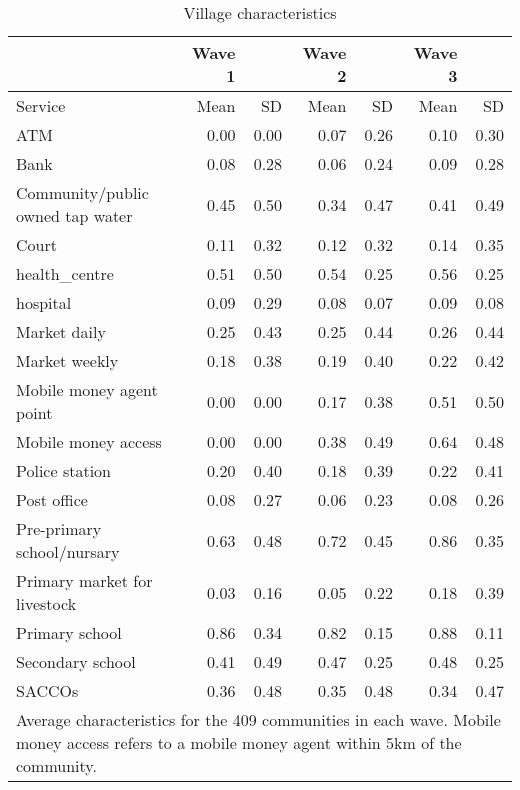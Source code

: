 \begin{table}[htbp] 
  \centering
  \caption{Village characteristics} \label{village sum}
    \begin{tabular}{lrrrrrr}
    \toprule
          & Wave 1 &       & Wave 2 &       & Wave 3 &  \\
    \midrule
     Service     & Mean  &  SD   & Mean  &  SD   & Mean  &  SD  \\
  
    ATM   & 0.00  & 0.00  & 0.07  & 0.26  & 0.10  & 0.30 \\
    Bank  & 0.08  & 0.28  & 0.06  & 0.24  & 0.09  & 0.28 \\
    Community/public owned tap water & 0.45  & 0.50  & 0.34  & 0.47  & 0.41  & 0.49 \\
    Court & 0.11  & 0.32  & 0.12  & 0.32  & 0.14  & 0.35 \\
    health\_centre&    0.51&    0.50 & 0.54 & 0.25 &0.56  & 0.25 \\
hospital    &    0.09&     0.29 & 0.08 & 0.07 & 0.09 & 0.08 \\
    Market daily & 0.25  & 0.43  & 0.25  & 0.44  & 0.26  & 0.44 \\
    Market weekly & 0.18  & 0.38  & 0.19  & 0.40  & 0.22  & 0.42\\
    Mobile money agent point & 0.00  & 0.00  & 0.17  & 0.38  & 0.51  & 0.50 \\
    Mobile money access  & 0.00  & 0.00  & 0.38  & 0.49  & 0.64  & 0.48 \\
   
    Police station & 0.20  & 0.40  & 0.18  & 0.39  & 0.22  & 0.41 \\
    Post office & 0.08  & 0.27  & 0.06  & 0.23  & 0.08  & 0.26 \\
    Pre-primary school/nursary & 0.63  & 0.48  & 0.72  & 0.45  & 0.86  & 0.35 \\
    Primary market for livestock & 0.03  & 0.16  & 0.05  & 0.22  & 0.18  & 0.39 \\
     Primary school&    0.86&    0.34 & 0.82 & 0.15 & 0.88 & 0.11\\
Secondary school&    0.41&   0.49& 0.47 &0.25 &0.48 & 0.25\\SACCOs & 0.36  & 0.48  & 0.35  & 0.48  & 0.34  & 0.47 \\
    \bottomrule
    \multicolumn{7}{p{13cm}}{Average characteristics for the 409 communities in each wave. Mobile money access refers to a mobile money agent within 5km of the community.}
    \end{tabular}%
  \label{tab:addlabel}%
\end{table}%
